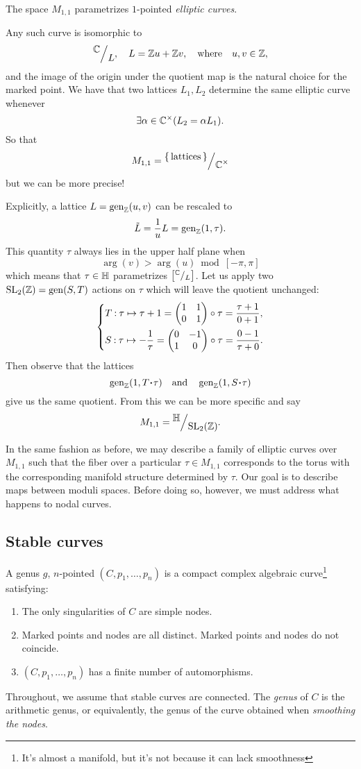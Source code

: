 \documentclass[12pt]{memoir}
\begin{document}
\begin{Ex}
    The space $M_{1,1}$ parametrizes $1$-pointed \emph{elliptic curves}.\par
    Any such curve is isomorphic to 
    $$\quot{\bC}{L},\quad L=\bZ u+\bZ v,\word{where}u,v\in\bZ,$$
    and the image of the origin under the quotient map is the natural choice for the marked point. We have that two lattices $L_1,L_2$ determine the same elliptic curve whenever 
    $$\exists \alpha\in\mathbb{C}^\times(L_2=\alpha L_1).$$
    So that 
    $$M_{1,1}=\quot{\set{\text{lattices}}}{\bC^\x}$$
    but we can be more precise!\par
    Explicitly, a lattice $L=\operatorname{gen}_{\mathbb{Z}}(u,v)$ can be rescaled to
    $$\tilde{L}=\frac{1}{u}L=\operatorname{gen}_{\mathbb{Z}}(1,\tau).$$
    This quantity $\tau$ always lies in the upper half plane when 
    $$\arg(v)>\arg(u)\bmod[-\pi,\pi]$$
    which means that $\tau\in\mathbb{H}$ parametrizes $\bonj{\quot{\bC}{L}}$. 
    Let us apply two $\mathrm{SL}_2(\mathbb{Z})=\operatorname{gen}(S,T)$ actions on $\tau$ which will leave the quotient unchanged:
    $$
    \left\lbrace
    \begin{aligned}
        &T\mathbin{:}\tau\mapsto\tau+1=\begin{pmatrix} 1 & 1 \\ 0 & 1 \end{pmatrix}\circ\tau=\frac{\tau+1}{0+1},\\
        &S\mathbin{:}\tau\mapsto-\frac1\tau=\begin{pmatrix} 0 & -1 \\ 1 & 0 \end{pmatrix}\circ\tau=\frac{0-1}{\tau+0}.
    \end{aligned}
    \right.
    $$
    Then observe that the lattices
    $$\gen_\bZ(1,T\.\tau)\word{and}\gen_\bZ(1,S\.\tau)$$
    give us the same quotient. From this we can be more specific and say 
    $$M_{1,1}=\quot{\bH}{\rSL_2(\bZ)}.$$
\end{Ex}

In the same fashion as before, we may describe a family of elliptic curves over $M_{1,1}$ such that the fiber over a particular $\tau\in M_{1,1}$ corresponds to the torus with the corresponding manifold structure determined by $\tau$. Our goal is to describe maps between moduli spaces. Before doing so, however, we must address what happens to nodal curves.

\subsection{Stable curves}

\begin{Def}
    A genus $g$, $n$-pointed  $(C,p_1,\dots,p_n)$ is a compact complex algebraic curve\footnote{It's almost a manifold, but it's not because it can lack smoothness} satisfying:
    \begin{enumerate}
        \item The only singularities of $C$ are simple nodes.
        \item Marked points and nodes are all distinct. Marked points and nodes do not coincide.
        \item\label{fin-number-auts} $(C,p_1,\dots,p_n)$ has a finite number of automorphisms.
    \end{enumerate}
    Throughout, we assume that stable curves are connected. The \emph{genus} of $C$ is the arithmetic genus, or equivalently, the genus of the curve obtained when \emph{smoothing the nodes}.
\end{Def}
\end{document}
